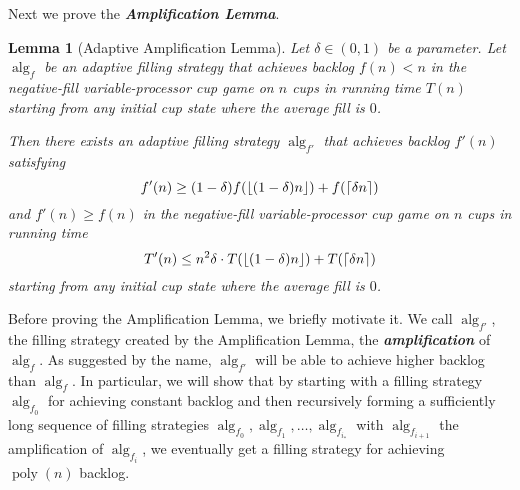 \documentclass[twocolumn]{article}[10pt]
\newcommand{\defn}[1]{{\textit{\textbf{\boldmath #1}}}\xspace}
\DeclareMathOperator{\poly}{\text{poly}}
\DeclareMathOperator{\alg}{\text{alg}}
\DeclarePairedDelimiter\ceil{\lceil}{\rceil}
\DeclarePairedDelimiter\floor{\lfloor}{\rfloor}
\newtheorem{lemma}{Lemma}
\begin{document}
Next we prove the \defn{Amplification Lemma}.
\begin{lemma}[Adaptive Amplification Lemma]\label{lem:adaptiveAmplification}
  Let $\delta\in(0,1)$ be a parameter.
  Let $\alg_f$ be an adaptive filling strategy that 
  achieves backlog $f(n) < n$ in the negative-fill variable-processor cup game
  on $n$ cups in running time $T(n)$ starting from any initial
  cup state where the average fill is $0$.

  Then there exists an adaptive filling strategy $\alg_{f'}$ that
  achieves backlog $f'(n)$ satisfying 
  $$f'(n) \ge (1-\delta)f(\floor{(1-\delta)n}) + f(\ceil{\delta n}) $$
  and $f'(n) \ge f(n)$
  in the negative-fill variable-processor cup game on $n$ cups in running time 
  $$T'(n) \le n^2 \delta \cdot T(\floor{(1-\delta)n}) + T(\ceil{\delta n})$$
  starting from any initial cup state where the average fill is $0$.
\end{lemma}

Before proving the Amplification Lemma, we briefly motivate it. 
We call $\alg_{f'}$, the filling strategy created by the Amplification
Lemma, the \defn{amplification} of $\alg_f$.
As suggested by the name, $\alg_{f'}$ will be able to achieve
higher backlog than $\alg_f$. In particular, we
will show that by starting with a filling strategy $\alg_{f_0}$ for achieving
constant backlog and then recursively forming a sufficiently
long sequence of filling strategies $\alg_{f_0}, \alg_{f_1},
\ldots, \alg_{f_{i_*}}$ with
$\alg_{f_{i+1}}$ the amplification of $\alg_{f_i}$, we eventually
get a filling strategy for achieving $\poly(n)$ backlog.
  
\end{document}
